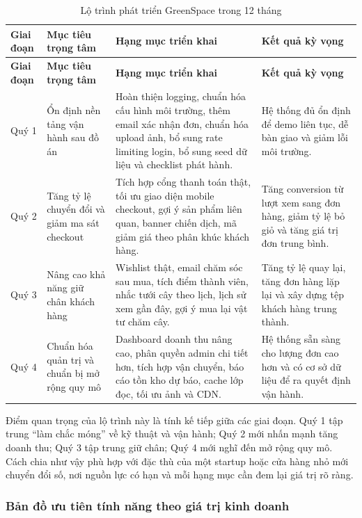 \documentclass[11pt, a4paper]{article}
\begin{document}
\begin{longtable}{|p{1.6cm}|p{3.4cm}|p{5cm}|p{4.5cm}|}
    \caption{Lộ trình phát triển GreenSpace trong 12 tháng}
    \label{tab:roadmap-12m} \\
    \hline
    \textbf{Giai đoạn} & \textbf{Mục tiêu trọng tâm} & \textbf{Hạng mục triển khai} & \textbf{Kết quả kỳ vọng} \\ \hline
    \endfirsthead
    \hline
    \textbf{Giai đoạn} & \textbf{Mục tiêu trọng tâm} & \textbf{Hạng mục triển khai} & \textbf{Kết quả kỳ vọng} \\ \hline
    \endhead
    Quý 1 &
    Ổn định nền tảng vận hành sau đồ án &
    Hoàn thiện logging, chuẩn hóa cấu hình môi trường, thêm email xác nhận đơn, chuẩn hóa upload ảnh, bổ sung rate limiting login, bổ sung seed dữ liệu và checklist phát hành. &
    Hệ thống đủ ổn định để demo liên tục, dễ bàn giao và giảm lỗi môi trường. \\ \hline
    Quý 2 &
    Tăng tỷ lệ chuyển đổi và giảm ma sát checkout &
    Tích hợp cổng thanh toán thật, tối ưu giao diện mobile checkout, gợi ý sản phẩm liên quan, banner chiến dịch, mã giảm giá theo phân khúc khách hàng. &
    Tăng conversion từ lượt xem sang đơn hàng, giảm tỷ lệ bỏ giỏ và tăng giá trị đơn trung bình. \\ \hline
    Quý 3 &
    Nâng cao khả năng giữ chân khách hàng &
    Wishlist thật, email chăm sóc sau mua, tích điểm thành viên, nhắc tưới cây theo lịch, lịch sử xem gần đây, gợi ý mua lại vật tư chăm cây. &
    Tăng tỷ lệ quay lại, tăng đơn hàng lặp lại và xây dựng tệp khách hàng trung thành. \\ \hline
    Quý 4 &
    Chuẩn hóa quản trị và chuẩn bị mở rộng quy mô &
    Dashboard doanh thu nâng cao, phân quyền admin chi tiết hơn, tích hợp vận chuyển, báo cáo tồn kho dự báo, cache lớp đọc, tối ưu ảnh và CDN. &
    Hệ thống sẵn sàng cho lượng đơn cao hơn và có cơ sở dữ liệu để ra quyết định vận hành. \\ \hline
\end{longtable}

Điểm quan trọng của lộ trình này là tính kế tiếp giữa các giai đoạn. Quý 1 tập trung
``làm chắc móng'' về kỹ thuật và vận hành; Quý 2 mới nhấn mạnh tăng doanh thu; Quý 3
tập trung giữ chân; Quý 4 mới nghĩ đến mở rộng quy mô. Cách chia như vậy phù hợp với
đặc thù của một startup hoặc cửa hàng nhỏ mới chuyển đổi số, nơi nguồn lực có hạn và
mỗi hạng mục cần đem lại giá trị rõ ràng.

\subsubsection{Bản đồ ưu tiên tính năng theo giá trị kinh doanh}
\end{document}
